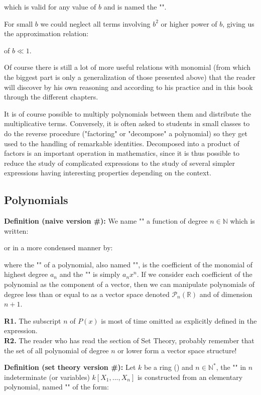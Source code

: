 	which is valid for any value of $b$ and is named the "". 
	
	For small $b$ we could neglect all terms involving $b^2$ or higher power of $b$, giving us the approximation relation:
	
	of $b\ll 1$.
	
	Of course there is still a lot of more useful relations with monomial (from which the biggest part is only a generalization of those presented above) that the reader will discover by his own reasoning and according to his practice and in this book through the different chapters.
	\begin{tcolorbox}[title=Remark,colframe=black,arc=10pt]
	It is of course possible to multiply polynomials between them and distribute the multiplicative terms. Conversely, it is often asked to students in small classes to do the reverse procedure ("factoring" or "decompose" a polynomial) so they get used to the handling of remarkable identities. Decomposed into a product of factors is an important operation in mathematics, since it is thus possible to reduce the study of complicated expressions to the study of several simpler expressions having interesting properties depending on the context.
	\end{tcolorbox}
	
	\subsection{Polynomials}\label{polynomial}
	\textbf{Definition (naive version \#\mydef):} We name "" a function of degree $n\in \mathbb{N}$ which is written:
	
	or in a more condensed manner by:
	
	 where the "" of a polynomial, also named "", is the coefficient of the monomial of highest degree $a_n$ and the "" is simply $a_nx^n$.
	If we consider each coefficient of the polynomial as the component of a vector\label{polynomial vector}, then we can manipulate polynomials of degree less than or equal to as a vector space denoted $\mathcal{P}_n(\mathbb{R})$ and of dimension $n+1$.
	\begin{tcolorbox}[title=Remarks,colframe=black,arc=10pt]
	\textbf{R1.} The subscript $n$ of $P (x)$ is most of time omitted as explicitly defined in the expression.\\
	
	\textbf{R2.} The reader who has read the section of Set Theory, probably remember that the set of all polynomial of degree $n$ or lower form a vector space structure!
	\end{tcolorbox}
	\textbf{Definition (set theory version \#\mydef):} Let $k$ be a ring () and $n\in \mathbb{N}^{*}$, the "\label{polynomial ring}" in $n$ indeterminate (or variables) $k[X_1,...,X_n]$ is constructed from an elementary polynomial, named "" of the form:
	
